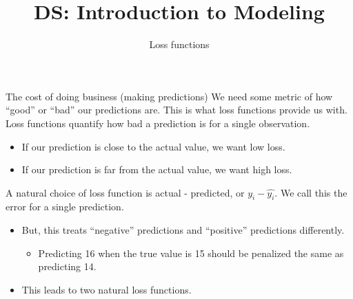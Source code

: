 \documentclass[aspectratio=169]{../latex_main/tntbeamer}  %
\title[Introduction]{DS: Introduction to Modeling}
\subtitle{Loss functions}
\begin{document}
	
	\maketitle
	\begin{frame}{The cost of doing business (making predictions)}
	    We need some metric of how “good” or “bad” our predictions are. This is what loss functions provide us with. Loss functions quantify how bad a prediction is for a single observation.
	    \begin{itemize}
	        \item If our prediction is close to the actual value, we want low loss.
	        \item If our prediction is far from the actual value, we want high loss.
	    \end{itemize}
	    \bigskip
	    A natural choice of loss function is actual - predicted, or      $y_i - \hat{y_i}$.  We call this the error for a single prediction.
	    \begin{itemize}
	        \item But, this treats “negative” predictions and “positive” predictions differently. 
	        \begin{itemize}
	            \item Predicting 16 when the true value is 15 should be penalized the same as predicting 14.
	        \end{itemize}
	        \item This leads to two natural loss functions. 
	    \end{itemize}
	    
	\end{frame}
	
\end{document}
